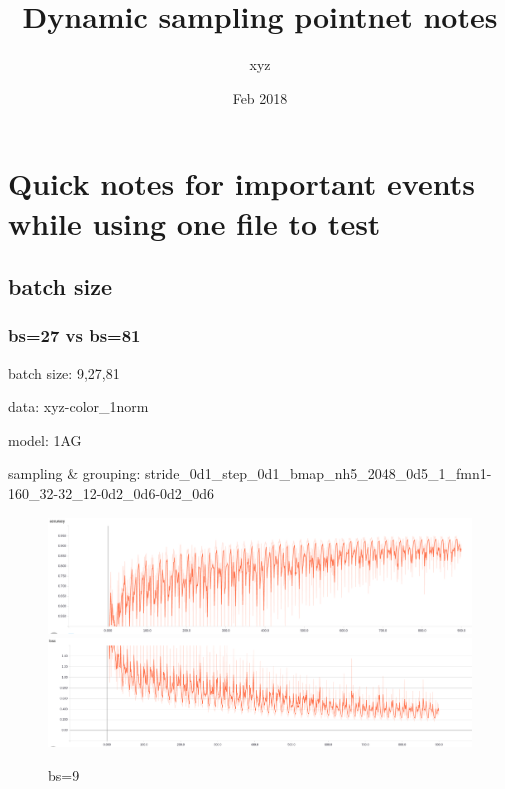 \documentclass{article}
\title{Dynamic sampling pointnet notes}
\author{xyz}
\date{Feb 2018}
\begin{document}
\begin{titlepage}
\maketitle
\end{titlepage}	

\section{Quick notes for important events while using one file to test}
\subsection{batch size}
\subsubsection{bs=27 vs bs=81}
batch size: 9,27,81 \par
data: xyz-color\_1norm\par
model: 1AG\par
sampling \& grouping: stride\_0d1\_step\_0d1\_bmap\_nh5\_2048\_0d5\_1\_fmn1-160\_32-32\_12-0d2\_0d6-0d2\_0d6\par
\begin{figure}[h]
	\caption{bs=9}
	\centering
	\includegraphics[width=\textwidth]{acc_log-model_1AG-gsbb_2C1-bs9-xyz-color_1norm-2048-mat}
	\includegraphics[width=\textwidth]{loss_log-model_1AG-gsbb_2C1-bs9-xyz-color_1norm-2048-mat}
\end{figure}
\end{document}
